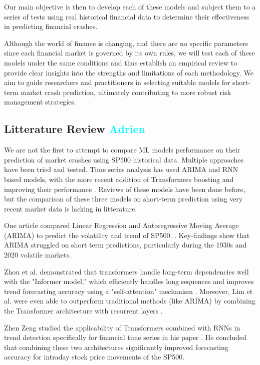 \documentclass[12pt, letterpaper]{article}
\begin{document}
Our main objective is then to develop each of these models and subject them to a series of tests using real historical financial data to determine their effectiveness in predicting financial crashes. 

Although the world of finance is changing, and there are no specific parameters since each financial market is governed by its own rules, we will test each of these models under the same conditions and thus establish an empirical review to provide clear insights into the strengths and limitations of each methodology. We aim to guide researchers and practitioners in selecting suitable models for short-term market crash prediction, ultimately contributing to more robust risk management strategies.



\subsection*{Litterature Review \textcolor{cyan}{Adrien}}
    We are not the first to attempt to compare ML models performance on their prediction of market crashes using SP500 historical data. Multiple approaches have been tried and tested. Time series analysis has used ARIMA and RNN based models, with the more recent addition of Transformers boosting and improving their performance  \cite{Okpeke, Ahmed, ArunKumar}. Reviews of these models have been done before, but the comparison of these three models on short-term prediction using very recent market data is lacking in litterature. 
    \newline

    One article compared Linear Regression and Autoregressive Moving Average (ARIMA) to predict the volatility and trend of SP500. \cite{sp500arimalstmregression}. 
    Key-findings show that ARIMA struggled on short term predictions, particularly during the 1930s and 2020 volatile markets. 
    
    Zhou et al. demonstrated that transformers handle long-term dependencies well with the "Informer model," which efficiently handles long sequences and improves trend forecasting accuracy using a "self-attention" mechanism \cite{zhou2021informer}. Moreover, Lim et al. were even able to outperform traditional methods (like ARIMA) by combining the Transformer architecture with recurrent layers \cite{lim2021temporal}. 
    
    Zhen Zeng studied the applicability of Transformers combined with RNNs in trend detection specifically for financial time series in his paper \cite{zeng2023financial}. He concluded that combining these two architectures significantly improved forecasting accuracy for intraday stock price movements of the SP500.
    \newline
\end{document}
